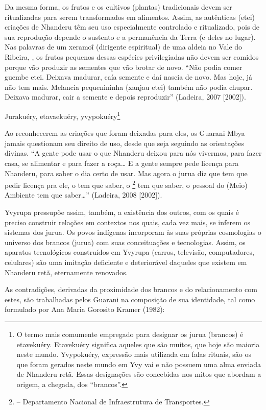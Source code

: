 {{Da mesma forma, os frutos e os cultivos (plantas) tradicionais devem ser
ritualizadas para serem transformados em alimentos. Assim, as
autênticas (etei) criações de Nhanderu têm seu uso especialmente
controlado e ritualizado, pois de sua reprodução depende o sustento e a
permanência da Terra (e deles no lugar). Nas palavras de um
xeramoĩ (dirigente espiritual) de uma aldeia no
Vale do Ribeira, , os frutos pequenos dessas espécies privilegiadas
não devem ser comidos porque vão produzir as sementes que vão brotar de
novo. ``Não podia comer guembe etei. Deixava madurar, caía semente e daí
nascia de novo. Mas hoje, já não tem mais. Melancia pequenininha
(xanjau etei) também não podia chupar. Deixava madurar, cair a semente
e depois reproduzir'' (Ladeira, 2007 [2002]).

Jurakuéry, etavaekuéry, yvypokuéry\footnote{O termo mais comumente
empregado para designar os jurua (brancos) é etavekuéry. Etavekuéry
significa aqueles que são muitos, que hoje são maioria neste mundo.
Yvypokuéry, expressão mais utilizada em falas rituais, são os que foram
gerados neste mundo em Yvy vai e não possuem uma alma enviada de
Nhanderu retã. Essas designações são concebidas nos mitos que abordam a
origem, a chegada, dos ``brancos''.}

Ao reconhecerem as criações que foram deixadas para eles, os Guarani
Mbya jamais questionam seu direito de uso, desde que seja seguindo as
orientações divinas. ``A gente pode usar o que Nhanderu deixou para nós
vivermos, para fazer casa, se alimentar e para fazer a roça\ldots{} E a
gente sempre pede licença para Nhanderu, para saber o dia certo de
usar. Mas agora o jurua diz que tem que pedir licença pra ele, o 
tem que saber, o \footnote{ – Departamento Nacional de
Infraestrutura de Transportes.} tem que saber, o pessoal do (Meio)
Ambiente tem que saber\ldots{}'' (Ladeira, 2008 [2002]).

Yvyrupa pressupõe assim, também, a existência dos outros, com os quais é
preciso construir relações em contextos nos quais, cada vez mais, se
inferem os sistemas dos jurua. Os povos indígenas incorporam às suas
próprias cosmologias o universo dos brancos (jurua) com suas
conceituações e tecnologias. Assim, os aparatos tecnológicos
construídos em Yvyrupa (carros, televisão, computadores, celulares) são
uma imitação deficiente e deteriorável daqueles que existem em Nhanderu
retã, eternamente renovados.

As contradições, derivadas da proximidade dos brancos e do
relacionamento com estes, são trabalhadas pelos Guarani na  composição
de sua identidade, tal como formulado por Ana Maria Gorosito Kramer
(1982):  

}}

